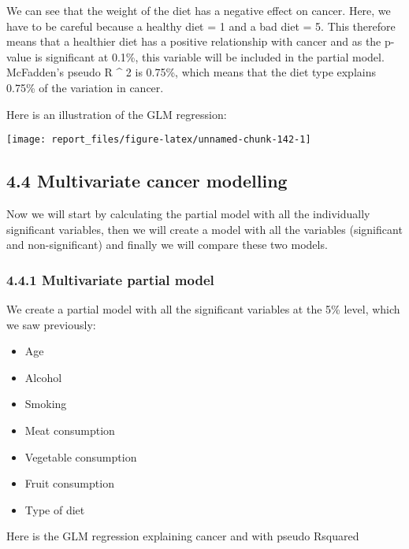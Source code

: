 \documentclass[
]{article}
\providecommand{\tightlist}{%
  \setlength{\itemsep}{0pt}\setlength{\parskip}{0pt}}
\begin{document}
We can see that the weight of the diet has a negative effect on cancer.
Here, we have to be careful because a healthy diet = 1 and a bad diet =
5. This therefore means that a healthier diet has a positive
relationship with cancer and as the p-value is significant at 0.1\%,
this variable will be included in the partial model. McFadden's pseudo R
\^{} 2 is 0.75\%, which means that the diet type explains 0.75\% of the
variation in cancer.

Here is an illustration of the GLM regression:

\begin{center}\texttt{[image: report\_files/figure-latex/unnamed-chunk-142-1]} \end{center}

\hypertarget{multivariate-cancer-modelling}{%
\subsection{4.4 Multivariate cancer
modelling}\label{multivariate-cancer-modelling}}

Now we will start by calculating the partial model with all the
individually significant variables, then we will create a model with all
the variables (significant and non-significant) and finally we will
compare these two models.

\hypertarget{multivariate-partial-model}{%
\subsubsection{4.4.1 Multivariate partial
model}\label{multivariate-partial-model}}

We create a partial model with all the significant variables at the 5\%
level, which we saw previously:

\begin{itemize}
\tightlist
\item
  Age
\item
  Alcohol
\item
  Smoking
\item
  Meat consumption
\item
  Vegetable consumption
\item
  Fruit consumption
\item
  Type of diet
\end{itemize}

Here is the GLM regression explaining cancer and with pseudo Rsquared
\end{document}
